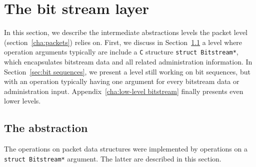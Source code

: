 


\chapter{The bit stream layer}
\label{cha:bitstream}

In this section, we describe the intermediate abstractions levels the
packet level (section~\ref{cha:packets}) relies on.
%
First, we discuss in Section~\ref{sec:bitstream}
a level where operation arguments typically are include a
\lstinline{C} structure \lstinline{struct Bitstream*}, which
encapsulates bitstream data and all related administration information.
%
In Section~\ref{sec:bit sequences}, we present a level still working on
bit sequences, but with an operation typically
having one argument for every bitstream data or administration input.
%
Appendix~\ref{cha:low-level bitstream} finally presents even lower levels.










\section{The  abstraction}
\label{sec:bitstream}

The operations on packet data structures were implemented by 
operations on a \lstinline{struct Bitstream*} argument.
%
The latter are described in this section.


